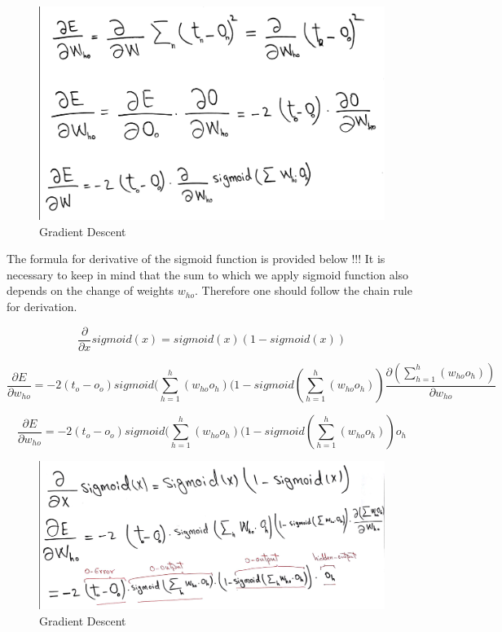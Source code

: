 \begin{figure}[H]
    \includegraphics[width=\linewidth]{pics/formula2.png}
    \caption{\label{fig:bp} Gradient Descent}
\end{figure}

The formula for derivative of the sigmoid function is provided below !!! It is necessary to keep in mind that the sum to which we apply sigmoid function also depends on the change of weights \(w_{ho}\). Therefore one should follow the chain rule for derivation.

\begin{equation}
\frac{\partial}{\partial x}sigmoid(x)=sigmoid(x)(1-sigmoid(x))
\end{equation}

\begin{equation}
\frac{\partial E}{\partial w_{ho}}=-2(t_o-o_o)sigmoid(\sum_{h=1}^{h} (w_{ho}o_h)(1-sigmoid(\sum_{h=1}^{h} (w_{ho}o_h))\frac{\partial (\sum_{h=1}^{h} (w_{ho}o_h))}{\partial w_{ho}}
\end{equation}

\begin{equation}
\frac{\partial E}{\partial w_{ho}}=-2(t_o-o_o)sigmoid(\sum_{h=1}^{h} (w_{ho}o_h)(1-sigmoid(\sum_{h=1}^{h} (w_{ho}o_h))o_h
\end{equation}

\begin{figure}[H]
    \includegraphics[width=\linewidth]{pics/formula3.png}
    \caption{\label{fig:bp} Gradient Descent}
\end{figure}

